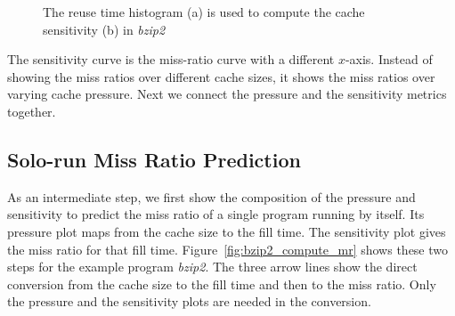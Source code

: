 \begin{figure}[h!]
\centering
  \hfill
\caption{The reuse time histogram (a) is used to compute the cache sensitivity (b) in \emph{bzip2}}
\label{fig:bzip2_sens}
\end{figure}

The sensitivity curve is the miss-ratio curve with a different
$x$-axis.  Instead of showing the miss ratios over different cache
sizes, it shows the miss ratios over varying cache pressure.  Next 
we connect the pressure and the sensitivity metrics together.

\subsection{Solo-run Miss Ratio Prediction}

As an intermediate step, we first show the composition of the pressure
and sensitivity to predict the miss ratio of a single program running
by itself.  Its pressure plot maps from the cache size to the fill
time.  The sensitivity plot gives the miss ratio for that fill time.
Figure~\ref{fig:bzip2_compute_mr} shows these two steps for the
example program \emph{bzip2}.  The three arrow lines show the direct
conversion from the cache size to the fill time and then to the miss
ratio.  Only the pressure and the sensitivity plots are needed in the
conversion.  


